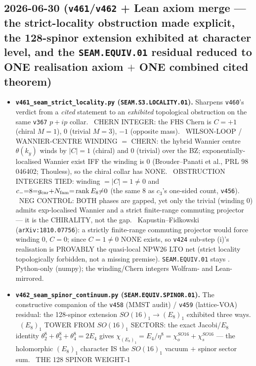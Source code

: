 \subsection*{2026-06-30 (\texttt{v461}/\texttt{v462} + Lean axiom merge --- the strict-locality obstruction made explicit, the 128-spinor extension exhibited at character level, and the \texttt{SEAM.EQUIV.01} residual reduced to ONE realisation axiom $+$ ONE combined cited theorem)}
\begin{itemize}
\item \textbf{\texttt{v461\_seam\_strict\_locality.py} (\texttt{SEAM.S3.LOCALITY.01}).} Sharpens \texttt{v460}'s verdict
from a \emph{cited} statement to an \emph{exhibited} topological obstruction on the same \texttt{v367} $p{+}ip$
collar. \mE\ CHERN INTEGER: the FHS Chern is $C{=}{+}1$ (chiral $M{=}1$), $0$ (trivial $M{=}3$), $-1$ (opposite
mass). \mE\ WILSON-LOOP / WANNIER-CENTRE WINDING $={}$ CHERN: the hybrid Wannier centre $\theta(k_y)$ winds by
$|C|{=}1$ (chiral) and $0$ (trivial) over the BZ; exponentially-localised Wannier exist IFF the winding is $0$
(Brouder--Panati et al., PRL 98 046402; Thouless), so the chiral collar has NONE. \mE\ OBSTRUCTION INTEGERS TIED:
winding $={}|C|{=}1{\neq}0$ and $c_-{=}8{=}g_{\mathrm{car}}{+}N_{\mathrm{fam}}{=}\operatorname{rank}E_8{\neq}0$ (the same $8$ as $c_3$'s
one-sided count, \texttt{v456}). \mE\ NEG CONTROL: BOTH phases are gapped, yet only the trivial (winding $0$) admits
exp-localised Wannier and a strict finite-range commuting projector --- it is the CHIRALITY, not the gap. \mC\mO\
Kapustin--Fidkowski (\texttt{arXiv:1810.07756}): a strictly finite-range commuting projector would force winding $0$,
$C{=}0$; since $C{=}1{\neq}0$ NONE exists, so \texttt{v424} sub-step (i)'s realisation is PROVABLY the quasi-local
NPW26 LTO net (strict locality topologically forbidden, not a missing premise). \texttt{SEAM.EQUIV.01} stays \mO.
Python-only (numpy); the winding/Chern integers Wolfram- and Lean-mirrored.
\item \textbf{\texttt{v462\_seam\_spinor\_continuum.py} (\texttt{SEAM.EQUIV.SPINOR.01}).} The constructive companion
of the \texttt{v458} (MMST audit) / \texttt{v459} (lattice-VOA) residual: the 128-spinor extension
$SO(16)_1{\to}(E_8)_1$ exhibited three ways. \mE\ $(E_8)_1$ TOWER FROM $SO(16)_1$ SECTORS: the exact Jacobi/$E_8$
identity $\theta_2^8{+}\theta_3^8{+}\theta_4^8{=}2E_4$ gives $\chi_{(E_8)_1}{=}E_4/\eta^8{=}\chi_o^{SO16}{+}\chi_s^{SO16}$
--- the holomorphic $(E_8)_1$ character IS the $SO(16)_1$ vacuum $+$ spinor sector sum. \mE\ THE 128 SPINOR WEIGHT-1

\end{itemize}
